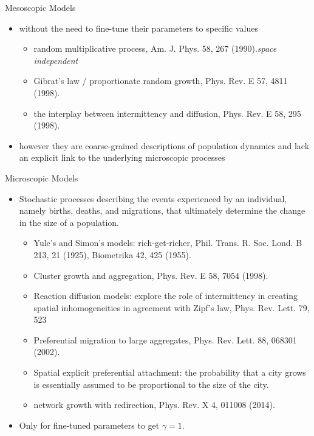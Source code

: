 \documentclass{beamer}
\begin{document}
\begin{frame}{Mesoscopic Models}
\begin{itemize}
  \item without the need to fine-tune their parameters to specific values
  \begin{itemize}
    \item random multiplicative process, Am. J. Phys. 58, 267 (1990).\emph{space independent}
    \item Gibrat's law / proportionate random growth, Phys. Rev. E 57, 4811 (1998).
    \item the interplay between intermittency and diffusion, Phys. Rev. E 58, 295 (1998).
  \end{itemize}
  \item however they are coarse-grained descriptions of population dynamics and lack an explicit link to the underlying microscopic processes
\end{itemize}
\end{frame}

\begin{frame}{Microscopic Models}
  \begin{itemize}
    \item Stochastic processes describing the events experienced by an individual, namely births, deaths, and migrations, that ultimately determine the change in the size of a population.
    \begin{itemize}
      \item Yule's and Simon's models: rich-get-richer, Phil. Trans. R. Soc. Lond. B 213, 21 (1925), Biometrika 42, 425 (1955).
      \item Cluster growth and aggregation, Phys. Rev. E 58, 7054 (1998).
      \item Reaction diffusion models: explore the role of intermittency in creating spatial inhomogeneities in agreement with Zipf’s law, Phys. Rev. Lett. 79, 523
      \item Preferential migration to large aggregates, Phys. Rev. Lett. 88, 068301 (2002).
      \item Spatial explicit preferential attachment: the probability that a city grows is essentially assumed to be proportional to the size of the city.
      \item network growth with redirection, Phys. Rev. X 4, 011008 (2014).
    \end{itemize}
    \item Only for fine-tuned parameters to get $\gamma=1$.
  \end{itemize}
\end{frame}
\end{document}

